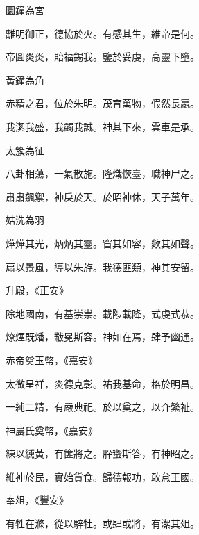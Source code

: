 \begin{pinyinscope}
 圜鐘為宮



 離明御正，德協於火。有感其生，維帝是何。



 帝圖炎炎，貽福錫我。鑒於妥虔，高靈下墮。



 黃鐘為角



 赤精之君，位於朱明。茂育萬物，假然長嬴。



 我潔我盛，我蠲我誠。神其下來，雲車是承。



 太簇為征



 八卦相蕩，一氣散施。隆熾恢臺，職神尸之。



 肅肅飆禦，神戾於天。於昭神休，天子萬年。



 姑洗為羽



 燁燁其光，炳炳其靈。窅其如容，欻其如聲。



 扇以景風，導以朱斿。我德匪類，神其安留。



 升殿，《正安》



 除地國南，有基崇祟。載陟載降，式虔式恭。



 燎煙既燔，黻冕斯容。神如在焉，肆予幽通。



 赤帝奠玉幣，《嘉安》



 太微呈祥，炎德克彰。祐我基命，格於明昌。



 一純二精，有嚴典祀。於以奠之，以介繁祉。



 神農氏奠幣，《嘉安》



 練以纁黃，有篚將之。肸蠁斯答，有神昭之。



 維神於民，實始貨食。歸德報功，敢怠王國。



 奉俎，《豐安》



 有牲在滌，從以騂牡。或肆或將，有潔其俎。




\end{pinyinscope}
